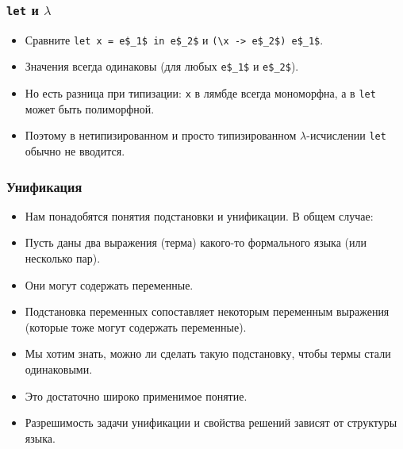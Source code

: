 \documentclass[11pt]{beamer}
\begin{document}
\begin{frame}[fragile]
\frametitle{\lstinline|let| и $\lambda$}
\begin{itemize}
    \item Сравните \lstinline[mathescape]|let x = e$_1$ in e$_2$| и \lstinline[mathescape]|(\x -> e$_2$) e$_1$|.
    \pause
    \item Значения всегда одинаковы (для любых \lstinline[mathescape]|e$_1$| и \lstinline[mathescape]|e$_2$|).
    \pause
    \item Но есть разница при типизации: \pause \lstinline|x| в лямбде всегда мономорфна, а в \lstinline|let| может быть полиморфной.
    \pause
    \item Поэтому в нетипизированном и просто типизированном $\lambda$-исчислении \lstinline|let| обычно не вводится.
\end{itemize}
\end{frame}

\begin{frame}[fragile]
\frametitle{Унификация}
\begin{itemize}
    \item Нам понадобятся понятия подстановки и унификации. В общем случае:
    \pause 
    \item Пусть даны два выражения (терма) какого-то формального языка (или несколько пар). 
    \item Они могут содержать переменные.
    \pause
    \item Подстановка переменных сопоставляет некоторым переменным выражения (которые тоже могут содержать переменные).
    \pause
    \item Мы хотим знать, можно ли сделать такую подстановку, чтобы термы стали одинаковыми.
    \pause
    \item Это достаточно широко применимое понятие.
    \pause
    \item Разрешимость задачи унификации и свойства решений зависят от структуры языка. 
\end{itemize}
\end{frame}
\end{document}
